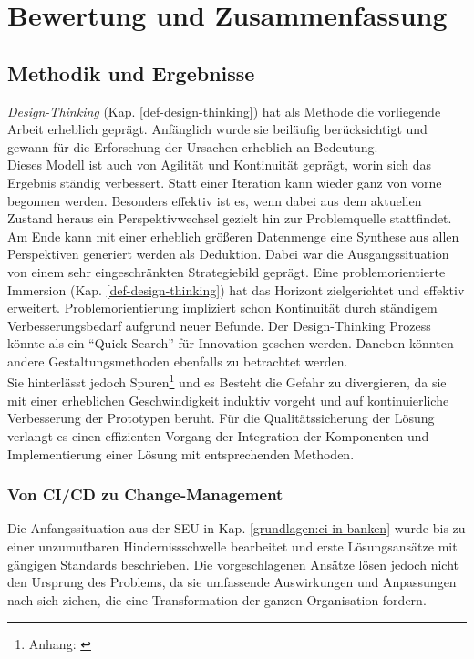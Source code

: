 \chapter{Bewertung und Zusammenfassung}
\label{chapter:evaluation}

\section{Methodik und Ergebnisse}
\emph{Design-Thinking} (Kap. \ref{def-design-thinking}) hat als Methode die vorliegende Arbeit erheblich geprägt. Anfänglich wurde sie beiläufig berücksichtigt und gewann für die Erforschung der Ursachen erheblich an Bedeutung. 
\medskip
\\
Dieses Modell ist auch von Agilität und Kontinuität geprägt, worin sich das Ergebnis ständig verbessert.
Statt einer Iteration kann wieder ganz von vorne begonnen werden. Besonders effektiv ist es, wenn dabei aus dem aktuellen Zustand heraus ein Perspektivwechsel gezielt hin zur Problemquelle stattfindet. Am Ende kann mit einer erheblich größeren Datenmenge eine Synthese aus allen Perspektiven generiert werden als Deduktion. Dabei war die Ausgangssituation von einem sehr eingeschränkten Strategiebild geprägt. Eine problemorientierte Immersion (Kap. \ref{def-design-thinking}) hat das Horizont zielgerichtet und effektiv erweitert. Problemorientierung impliziert schon Kontinuität durch ständigem Verbesserungsbedarf aufgrund neuer Befunde.
Der Design-Thinking Prozess könnte als ein \enquote{Quick-Search} für Innovation gesehen werden. Daneben könnten andere Gestaltungsmethoden ebenfalls zu betrachtet werden.
\medskip
\\
Sie hinterlässt jedoch Spuren\footnote{Anhang: \label{appendix:docker}} und es Besteht die Gefahr zu divergieren, da sie mit einer erheblichen Geschwindigkeit induktiv vorgeht und auf kontinuierliche Verbesserung der Prototypen beruht. Für die Qualitätssicherung der Lösung verlangt es einen effizienten Vorgang der Integration der Komponenten und Implementierung einer Lösung mit entsprechenden Methoden.

\subsection{Von CI/CD zu Change-Management}
Die Anfangssituation aus der \ac{SEU} in Kap. \ref{grundlagen:ci-in-banken} wurde bis zu einer unzumutbaren Hindernissschwelle bearbeitet und erste Lösungsansätze mit gängigen Standards beschrieben. Die vorgeschlagenen Ansätze lösen jedoch nicht den Ursprung des Problems, da sie umfassende Auswirkungen und Anpassungen nach sich ziehen, die eine Transformation der ganzen Organisation fordern. 

